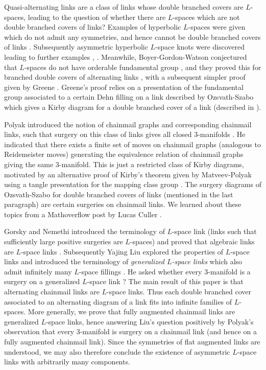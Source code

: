 \documentclass{amsart}
\theoremstyle{definition}
\theoremstyle{remark}
\begin{document}
Quasi-alternating links \cite[Definition 3.1]{MR2141852} are a class of links whose double branched covers are $L$-spaces, leading to  the question of whether there are $L$-spaces which are not double branched covers of links? Examples of hyperbolic $L$-spaces were given which do not admit any symmetries, and hence cannot be double branched covers of links \cite[Theorem 1.2]{MR3507256}. Subsequently asymmetric hyperbolic $L$-space knots were discovered leading to further examples \cite{MR4194294}, \cite{anderson2021lspace}. Meanwhile, Boyer-Gordon-Watson conjectured that $L$-spaces do not have orderable fundamental group \cite[Conjecture 1]{MR3072799}, and they proved this for branched double covers of alternating links \cite[Theorem 4]{MR3072799}, with a subsequent simpler proof given by Greene \cite[Theorem 2.1]{MR3778170}. Greene's proof relies on a presentation of the fundamental group associated to a certain Dehn filling on a link described by Ozsvath-Szabo which gives a Kirby diagram for a double branched cover of a link (described in \cite[Section 3.1]{MR3065184}). 

Polyak introduced the notion of chainmail graphs and corresponding chainmail links, such that surgery on this class of links  gives all closed 3-manifolds \cite{Polyak}. He indicated that there exists a finite set of moves on chainmail graphs (analogous to Reidemeister moves) generating the equivalence relation of chainmail graphs giving the same 3-manifold. This is just a restricted class of Kirby diagrams, motivated by an alternative proof of Kirby's theorem given by Matveev-Polyak using a tangle presentation for the mapping class group \cite{MR1266062}. 
The surgery diagrams of Ozsvath-Szabo for double branched covers of links (mentioned in the last paragraph) are certain surgeries on chainmail links. We learned about these topics from a Mathoverflow post by Lucas Culler \cite{315927}. 


Gorsky and Nemethi introduced the terminology of $L$-space link (links such that sufficiently large positive surgeries are $L$-spaces) and proved that algebraic links are $L$-space links \cite[Theorem 2]{MR3546454}. Subsequently Yajing Liu explored the properties of $L$-space links and introduced the terminology of {\it generalized $L$-space links} which also admit infinitely many $L$-space fillings \cite[Definition 2.9]{MR3692910}. He asked whether every 3-manifold is a surgery on a generalized $L$-space link \cite[Question 1.19]{MR3692910}? The main result of this paper is that alternating chainmail links are $L$-space links. Thus each double branched cover associated to an alternating diagram of a link fits into infinite families of $L$-spaces. 
 More generally, we prove that fully augmented chainmail links are generalized $L$-space links, hence answering Liu's question positively by Polyak's observation that every 3-manifold is surgery on a chainmail link (and hence on a fully augmented chainmail link). Since the symmetries of flat augmented links are understood, we may also therefore conclude the existence of asymmetric $L$-space links with arbitrarily many components. 
\end{document}
